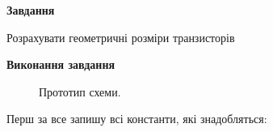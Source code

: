 \documentclass[a4paper,14pt]{extreport}
\begin{document}
\newpage
\setcounter{page}{1}


\begin{center}
    \textbf{Завдання}
\end{center}
Розрахувати геометричні розміри транзисторів


\begin{center}
  \textbf{Виконання завдання}
\end{center}

\begin{figure}[h!]
\caption{Прототип схеми.}
\label{ris1}
\end{figure}

Перш за все запишу всі константи, які знадобляться:\\
\end{document}
